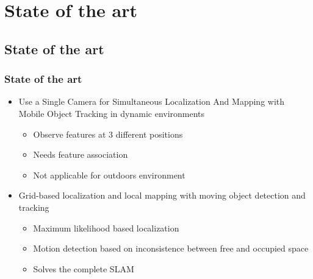 \documentclass{beamer}
\begin{document}
\section{State of the art}

\subsection*{State of the art}

	\begin{frame}
		\frametitle{State of the art}
		
			\begin{itemize}
			\item Use a Single Camera for Simultaneous Localization And Mapping with  Mobile Object Tracking in dynamic environments \cite{Migliore_2009_ICRA}
				\begin{itemize}			
				\item Observe features at 3 different positions
				\item Needs feature association
				\item Not applicable for outdoors environment 
				\end{itemize}		
			\item Grid-based localization and local mapping with moving object detection and tracking \cite{Vu201158}
				\begin{itemize}		
				\item Maximum likelihood based localization	
				\item Motion detection based on inconsistence between free and occupied space
				\item Solves the complete SLAM
				\end{itemize}	
			\end{itemize}		
	\end{frame}
\end{document}

